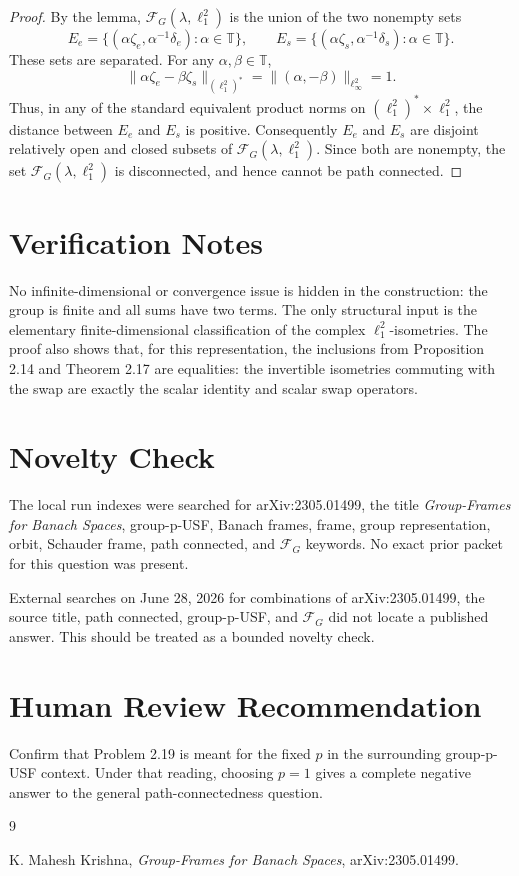 \documentclass[11pt]{article}
\newcommand{\T}{\mathbb T}
\newcommand{\FG}{\mathscr F_G}
\newcommand{\de}{\delta_e}
\newcommand{\ds}{\delta_s}
\newcommand{\ze}{\zeta_e}
\newcommand{\zs}{\zeta_s}
\begin{document}
\begin{proof}
By the lemma, \(\FG(\lambda,\ell_1^2)\) is the union of the two nonempty sets
\[
  E_e=\{(\alpha\ze,\alpha^{-1}\de):\alpha\in\T\},
  \qquad
  E_s=\{(\alpha\zs,\alpha^{-1}\ds):\alpha\in\T\}.
\]
These sets are separated. For any \(\alpha,\beta\in\T\),
\[
  \|\alpha\ze-\beta\zs\|_{(\ell_1^2)^*}
  =
  \|(\alpha,-\beta)\|_{\ell_\infty^2}
  =1.
\]
Thus, in any of the standard equivalent product norms on
\((\ell_1^2)^*\times\ell_1^2\), the distance between \(E_e\) and \(E_s\) is
positive. Consequently \(E_e\) and \(E_s\) are disjoint relatively open and
closed subsets of \(\FG(\lambda,\ell_1^2)\). Since both are nonempty, the set
\(\FG(\lambda,\ell_1^2)\) is disconnected, and hence cannot be path connected.
\end{proof}

\section*{Verification Notes}

No infinite-dimensional or convergence issue is hidden in the construction:
the group is finite and all sums have two terms. The only structural input is
the elementary finite-dimensional classification of the complex
\(\ell_1^2\)-isometries. The proof also shows that, for this representation,
the inclusions from Proposition 2.14 and Theorem 2.17 are equalities:
the invertible isometries commuting with the swap are exactly the scalar
identity and scalar swap operators.

\section*{Novelty Check}

The local run indexes were searched for arXiv:2305.01499, the title
\emph{Group-Frames for Banach Spaces}, group-p-USF, Banach frames, frame,
group representation, orbit, Schauder frame, path connected, and
\(\mathscr F_G\) keywords. No exact prior packet for this question was present.

External searches on June 28, 2026 for combinations of arXiv:2305.01499,
the source title, path connected, group-p-USF, and \(\mathscr F_G\) did not
locate a published answer. This should be treated as a bounded novelty check.

\section*{Human Review Recommendation}

Confirm that Problem 2.19 is meant for the fixed \(p\) in the surrounding
group-p-USF context. Under that reading, choosing \(p=1\) gives a complete
negative answer to the general path-connectedness question.

\begin{thebibliography}{9}

K. Mahesh Krishna,
\emph{Group-Frames for Banach Spaces},
arXiv:2305.01499.

\end{thebibliography}
\end{document}
